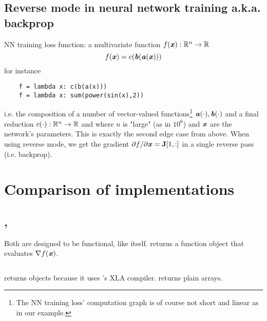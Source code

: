 \documentclass[11pt]{scrartcl}
\newcommand{\ipmpy}[1]{\inputminted[xleftmargin=0.9cm]{python}{#1}}
\begin{document}
\subsection{Reverse mode in neural network training a.k.a. backprop}

NN training loss function: a multivariate function $f(\bm{\mathit{x}}): \mathbb R^n\rightarrow \mathbb R$
\begin{equation}
    f(\bm{\mathit{x}}) = c(\bm{\mathit{b}}(\bm{\mathit{a}}(\bm{\mathit{x}})))
\end{equation}
for instance
\begin{verbatim}
    f = lambda x: c(b(a(x)))
    f = lambda x: sum(power(sin(x),2))
\end{verbatim}
i.e. the composition of a number of vector-valued functions\footnote{ The NN
training loss' computation graph is of course not short and linear as in our
example.} $\bm{\mathit{a}}(\cdot), \bm{\mathit{b}}(\cdot)$ and a final reduction $c(\cdot): \mathbb
R^n\rightarrow \mathbb R$ and where $n$ is "large" (as in $10^6$) and $\bm{\mathit{x}}$ are the
network's parameters. This is exactly the second edge case from above. When
using reverse mode, we get the gradient $\partial f/\partial \bm{\mathit{x}} = \bm{\mathbf{J}}[1,:]$ in a
single reverse pass (i.e. backprop).

\section{Comparison of implementations}

\subsection{\jax, \autograd}

Both are designed to be functional, like \numpy itself.  returns a
function object that evaluates $\nabla f(\bm{\mathit{x}})$.
%
\ipmpy{../talk/code/jax_ad_teaser_grad_usage.py}
%
\jax returns  objects because it uses \tf's XLA compiler.
\autograd returns plain \numpy arrays.
\end{document}

